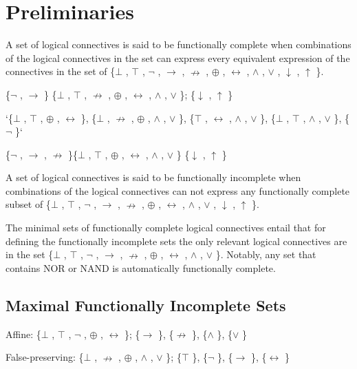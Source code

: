 \hypertarget{preliminaries}{%
\section{Preliminaries}\label{preliminaries}}

A set of logical connectives is said to be functionally complete when
combinations of the logical connectives in the set can express every
equivalent expression of the connectives in the set of \{$\bot$ , $\top$ , $\neg$ , $\to$ , $\nrightarrow$ ,
$\oplus$ , $\leftrightarrow$ , $\land$ , $\lor$ , $\downarrow$ , $\uparrow$ \}.

\{$\neg$ , $\to$ \} \{$\bot$ , $\top$ , $\nrightarrow$ , $\oplus$ , $\leftrightarrow$ , $\land$ , $\lor$ \}; \{$\downarrow$ , $\uparrow$ \}

`\{$\bot$ , $\top$ , $\oplus$ , $\leftrightarrow$ \}, \{$\bot$ , $\nrightarrow$ , $\oplus$ , $\land$ , $\lor$ \}, \{$\top$ , $\leftrightarrow$ , $\land$ , $\lor$ \}, \{$\bot$ , $\top$ , $\land$ , $\lor$ \},
\{$\neg$ \}`

\{$\neg$ , $\to$ , $\nrightarrow$ \}\{$\bot$ , $\top$ , $\oplus$ , $\leftrightarrow$ , $\land$ , $\lor$ \} \{$\downarrow$ , $\uparrow$ \}

A set of logical connectives is said to be functionally incomplete when
combinations of the logical connectives can not express any functionally
complete subset of \{$\bot$ , $\top$ , $\neg$ , $\to$ , $\nrightarrow$ , $\oplus$ , $\leftrightarrow$ , $\land$ , $\lor$ , $\downarrow$ , $\uparrow$ \}.

The minimal sets of functionally complete logical connectives entail
that for defining the functionally incomplete sets the only relevant
logical connectives are in the set \{$\bot$ , $\top$ , $\neg$ , $\to$ , $\nrightarrow$ , $\oplus$ , $\leftrightarrow$ , $\land$ , $\lor$ \}.
Notably, any set that contains NOR or NAND is automatically functionally
complete.

\hypertarget{maximal-functionally-incomplete-sets}{%
\subsection{Maximal Functionally Incomplete
Sets}\label{maximal-functionally-incomplete-sets}}

Affine: \{$\bot$ , $\top$ , $\neg$ , $\oplus$ , $\leftrightarrow$ \}; \{$\to$ \}, \{$\nrightarrow$ \}, \{$\land$ \}, \{$\lor$ \}

False-preserving: \{$\bot$ , $\nrightarrow$ , $\oplus$ , $\land$ , $\lor$ \}; \{$\top$ \}, \{$\neg$ \}, \{$\to$ \}, \{$\leftrightarrow$ \}

